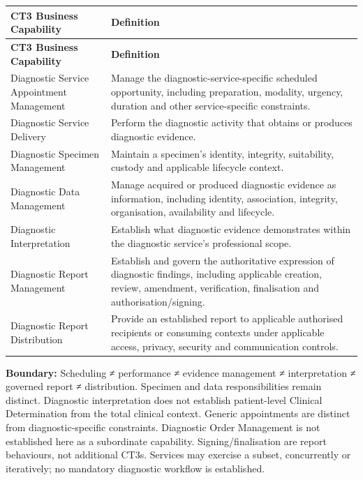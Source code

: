 \label{rad:business:465}
\begingroup\small\setlength{\TableWidth}{\dimexpr\linewidth-4\tabcolsep-3\arrayrulewidth\relax}
\begin{longtable}{|>{\raggedright\arraybackslash}p{0.35\TableWidth}|>{\raggedright\arraybackslash}p{0.65\TableWidth}|}
\hline\rowcolor{TableHead}\textbf{CT3 Business Capability} & \textbf{Definition}\\\hline\endfirsthead
\hline\rowcolor{TableHead}\textbf{CT3 Business Capability} & \textbf{Definition}\\\hline\endhead
\hline\endfoot
Diagnostic Service Appointment Management & Manage the diagnostic-service-specific scheduled opportunity, including preparation, modality, urgency, duration and other service-specific constraints.\\\hline
Diagnostic Service Delivery & Perform the diagnostic activity that obtains or produces diagnostic evidence.\\\hline
Diagnostic Specimen Management & Maintain a specimen’s identity, integrity, suitability, custody and applicable lifecycle context.\\\hline
Diagnostic Data Management & Manage acquired or produced diagnostic evidence as information, including identity, association, integrity, organisation, availability and lifecycle.\\\hline
Diagnostic Interpretation & Establish what diagnostic evidence demonstrates within the diagnostic service’s professional scope.\\\hline
Diagnostic Report Management & Establish and govern the authoritative expression of diagnostic findings, including applicable creation, review, amendment, verification, finalisation and authorisation/\allowbreak{}signing.\\\hline
Diagnostic Report Distribution & Provide an established report to applicable authorised recipients or consuming contexts under applicable access, privacy, security and communication controls.\\\hline
\end{longtable}\endgroup
{}\label{rad:business:475}

\textbf{Boundary:} Scheduling ≠ performance ≠ evidence management ≠ interpretation ≠ governed report ≠ distribution. Specimen and data responsibilities remain distinct. Diagnostic interpretation does not establish patient-level Clinical Determination from the total clinical context. Generic appointments are distinct from diagnostic-specific constraints. Diagnostic Order Management is not established here as a subordinate capability. Signing/\allowbreak{}finalisation are report behaviours, not additional CT3s. Services may exercise a subset, concurrently or iteratively; no mandatory diagnostic workflow is established.

